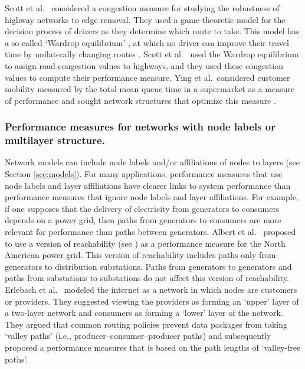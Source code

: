 \documentclass{comnet-mod}
\begin{document}
Scott et al.~\cite{Scott2006} considered a congestion measure for studying the robustness of highway networks to edge removal. They used a game-theoretic model \cite{Wardrop1952, Correa2010} for the decision process of drivers as they determine which route to take. This model has a so-called `Wardrop equilibrium' \cite{Correa2010}, at which no driver can improve their travel time by unilaterally changing routes \cite{Scott2006}. Scott et al.~\cite{Scott2006} used the Wardrop equilibrium to assign road-congestion values to highways, and they used these congestion values to compute their performance measure. Ying et al.~considered customer mobility measured by the total mean queue time in a supermarket as a measure of performance and sought network structures that optimize this measure \cite{Ying2023}.


\subsubsection{Performance measures for networks with node labels or multilayer structure.}

Network models can include node labels \cite{Dickinson2003} and/or affiliations of nodes to layers \cite{Kivela2014} (see Section \ref{sec:models}). For many applications, performance measures that use node labels and layer affiliations have clearer links to system performance than performance measures that ignore node labels and layer affiliations. For example, if one supposes that the delivery of electricity from generators to consumers depends on a power grid, then paths from generators to consumers are more relevant for performance than paths between generators. Albert et al.~\cite{Albert2004} proposed to use a version of reachability (see ) as a performance measure for the North American power grid. This version of reachability includes paths only from generators to distribution substations. Paths from generators to generators and paths from substations to substations do not affect this version of reachability. Erlebach et al.~\cite{Erlebach2006} modeled the internet as a network in which nodes are customers or providers. They suggested viewing the providers as forming an `upper' layer of a two-layer network and consumers as forming a `lower' layer of the network. They argued that common routing policies prevent data packages from taking `valley paths' (i.e., producer--consumer--producer paths) and subsequently proposed a performance measures that is based on the path lengths of `valley-free paths'. 
\end{document}
